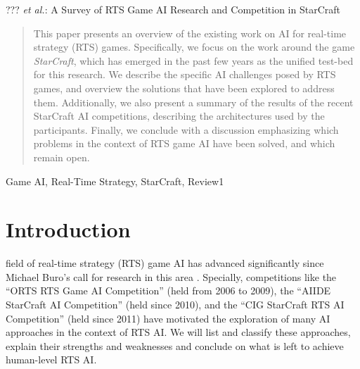 \documentclass[journal]{IEEEtran}
\begin{document}
%
{??? \MakeLowercase{\textit{et al.}}: A Survey of RTS Game AI Research and Competition in StarCraft}

\maketitle

\begin{abstract}
This paper presents an overview of the existing work on AI for real-time strategy (RTS) games. Specifically, we focus on the work around the game {\em StarCraft}, which has emerged in the past few years as the unified test-bed for this research. We describe the specific AI challenges posed by RTS games, and overview the solutions that have been explored to address them. Additionally, we also present a summary of the results of the recent StarCraft AI competitions, describing the architectures used by the participants. Finally, we conclude with a discussion emphasizing which problems in the context of RTS game AI have been solved, and which remain open.
\end{abstract}

\begin{IEEEkeywords}
Game AI, Real-Time Strategy, StarCraft, Review1

\end{IEEEkeywords}

%
\IEEEpeerreviewmaketitle

\section{Introduction}\label{sec:intro}
 field of real-time strategy (RTS) game AI has advanced significantly since Michael Buro's call for research in this area \cite{Buro03rts}. Specially, competitions like the ``ORTS RTS Game AI Competition'' (held from 2006 to 2009), the ``AIIDE StarCraft AI Competition'' (held since 2010), and the
``CIG StarCraft RTS AI Competition'' (held since 2011) have motivated the exploration of many AI approaches in the context of RTS AI. We will list and classify these approaches, explain their 
strengths and weaknesses and conclude on what is left to achieve human-level 
RTS AI.
\end{document}
